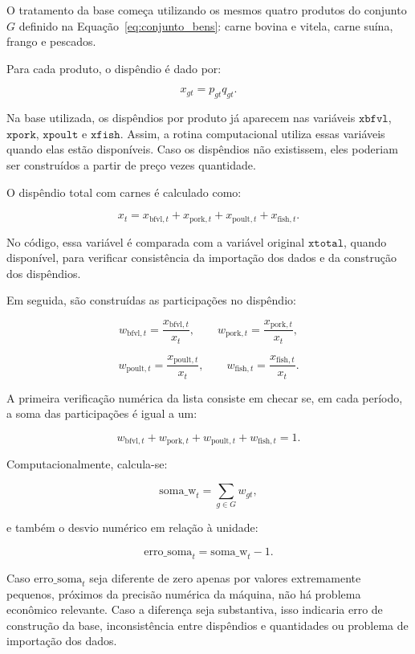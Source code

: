 \documentclass[12pt,a4paper]{article}
\begin{document}
O tratamento da base começa utilizando os mesmos quatro produtos do conjunto \(G\) definido na Equação~\eqref{eq:conjunto_bens}: carne bovina e vitela, carne suína, frango e pescados.

Para cada produto, o dispêndio é dado por:

\[
x_{gt}
=
p_{gt}q_{gt}.
\tag{23}
\label{eq:disp_produto}
\]

Na base utilizada, os dispêndios por produto já aparecem nas variáveis \(\texttt{xbfvl}\), \(\texttt{xpork}\), \(\texttt{xpoult}\) e \(\texttt{xfish}\). Assim, a rotina computacional utiliza essas variáveis quando elas estão disponíveis. Caso os dispêndios não existissem, eles poderiam ser construídos a partir de preço vezes quantidade.

O dispêndio total com carnes é calculado como:

\[
x_t
=
x_{\text{bfvl},t}
+
x_{\text{pork},t}
+
x_{\text{poult},t}
+
x_{\text{fish},t}.
\tag{24}
\label{eq:xtotal}
\]

No código, essa variável é comparada com a variável original \(\texttt{xtotal}\), quando disponível, para verificar consistência da importação dos dados e da construção dos dispêndios.

Em seguida, são construídas as participações no dispêndio:

\[
w_{\text{bfvl},t}
=
\frac{x_{\text{bfvl},t}}{x_t},
\qquad
w_{\text{pork},t}
=
\frac{x_{\text{pork},t}}{x_t},
\tag{25}
\label{eq:w_bfvl_pork}
\]

\[
w_{\text{poult},t}
=
\frac{x_{\text{poult},t}}{x_t},
\qquad
w_{\text{fish},t}
=
\frac{x_{\text{fish},t}}{x_t}.
\tag{26}
\label{eq:w_poult_fish}
\]

A primeira verificação numérica da lista consiste em checar se, em cada período, a soma das participações é igual a um:

\[
w_{\text{bfvl},t}
+
w_{\text{pork},t}
+
w_{\text{poult},t}
+
w_{\text{fish},t}
=
1.
\tag{27}
\label{eq:soma_participacoes}
\]

Computacionalmente, calcula-se:

\[
\text{soma\_w}_t
=
\sum_{g \in G}
w_{gt},
\tag{28}
\label{eq:soma_w}
\]

e também o desvio numérico em relação à unidade:

\[
\text{erro\_soma}_t
=
\text{soma\_w}_t - 1.
\tag{29}
\label{eq:erro_soma}
\]

Caso \(\text{erro\_soma}_t\) seja diferente de zero apenas por valores extremamente pequenos, próximos da precisão numérica da máquina, não há problema econômico relevante. Caso a diferença seja substantiva, isso indicaria erro de construção da base, inconsistência entre dispêndios e quantidades ou problema de importação dos dados.
\end{document}
